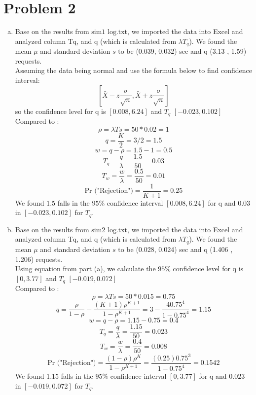 \documentclass{article}   	                         %
\begin{document}
\section*{Problem 2}
\begin{enumerate}[(a)]
\item
Base on the results from $\text {sim1 log.txt}$, we imported the data into Excel and analyzed column Tq, and q (which is calculated from $\lambda T_q$). We found the mean $\mu$ and standard deviation $s$ to be (0.039, 0.032) sec and q (3.13 , 1.59) requests.\\
Assuming the data being normal and use the formula below to find confidence interval:\\
\begin{equation} \left[\bar X - z\frac{\sigma}{\sqrt n}, \bar X + z\frac{\sigma}{\sqrt n}\right]\end{equation}
so the confidence level for q is $[0.008, 6.24]$ and $T_q$ $[-0.023, 0.102]$\\
Compared to :\\
$$\rho = \lambda Ts = 50*0.02 = 1$$
$$q = \frac{K}{2} = 3/2 = 1.5$$
$$w = q-\rho = 1.5 - 1 = 0.5 $$
$$T_q = \frac{q}{\lambda} = \frac{1.5}{50} = 0.03$$
$$T_w = \frac{w}{\lambda} = \frac{0.5}{50} = 0.01$$
$$\text {Pr ("Rejection")} = \frac{1}{K+1} = 0.25 $$
We found $1.5$ falls in the $95\%$ confidence interval $[0.008, 6.24]$ for q and $ 0.03$ in $[-0.023, 0.102]$ for $T_q$.\\

\item
Base on the results from $\text {sim2 log.txt}$, we imported the data into Excel and analyzed column Tq, and q (which is calculated from $\lambda T_q$). We found the mean $\mu$ and standard deviation $s$ to be (0.028, 0.024) sec and q (1.406 , 1.206) requests.\\
Using equation from part (a), we calculate the $95\%$ confidence level for q is $[0, 3.77]$ and $T_q$ $[-0.019, 0.072]$\\
Compared to :\\
$$\rho = \lambda Ts = 50*0.015 = 0.75$$
$$q = \frac{\rho}{1-\rho} - \frac{(K+1)\rho^{K+1}}{1-\rho^{K+1}} = 3 - \frac{4 0.75^4}{1-0.75^4} = 1.15$$
$$w = q-\rho = 1.15 - 0.75 = 0.4 $$
$$T_q = \frac{q}{\lambda} = \frac{1.15}{50} = 0.023$$
$$T_w = \frac{w}{\lambda} = \frac{0.4}{50} = 0.008$$
$$\text {Pr ("Rejection")} = \frac{(1-\rho)\rho^K}{1-\rho^{K+1}} = \frac{(0.25)0.75^3}{1-0.75^4} = 0.1542  $$
We found $1.15$ falls in the $95\%$ confidence interval $[0, 3.77]$ for q and $ 0.023$ in $[-0.019, 0.072]$ for $T_q$.\\


\end{enumerate}
\end{document}
